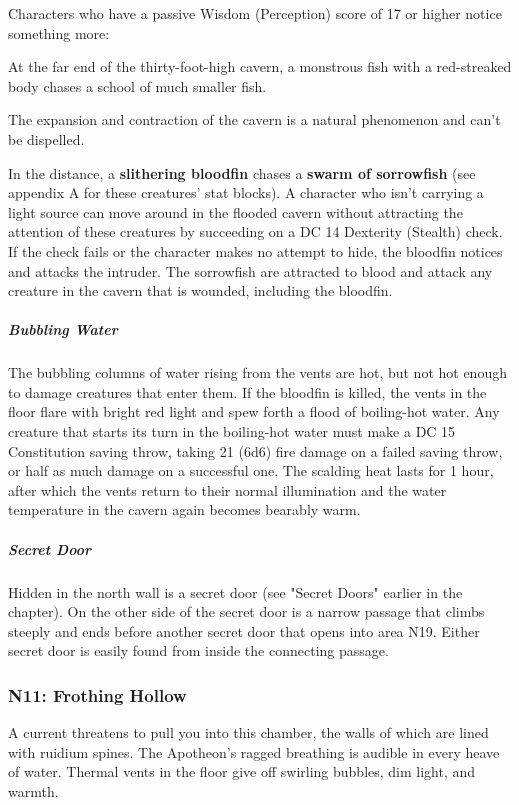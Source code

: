 \documentclass[10pt,a4paper,twoside,fancy,bg=print,twocolumn,openany,nodeprecatedcode]{dndbook}
\begin{document}
Characters who have a passive Wisdom (Perception) score of 17 or higher notice something more:

\begin{DndReadAloud}{}
At the far end of the thirty-foot-high cavern, a monstrous fish with a red-streaked body chases a school of much smaller fish.

\end{DndReadAloud}

The expansion and contraction of the cavern is a natural phenomenon and can't be dispelled.

In the distance, a \textbf{slithering bloodfin} chases a \textbf{swarm of sorrowfish} (see appendix A for these creatures' stat blocks). A character who isn't carrying a light source can move around in the flooded cavern without attracting the attention of these creatures by succeeding on a DC 14 Dexterity (Stealth) check. If the check fails or the character makes no attempt to hide, the bloodfin notices and attacks the intruder. The sorrowfish are attracted to blood and attack any creature in the cavern that is wounded, including the bloodfin.

\subparagraph{Bubbling Water}
The bubbling columns of water rising from the vents are hot, but not hot enough to damage creatures that enter them. If the bloodfin is killed, the vents in the floor flare with bright red light and spew forth a flood of boiling-hot water. Any creature that starts its turn in the boiling-hot water must make a DC 15 Constitution saving throw, taking 21 (6d6) fire damage on a failed saving throw, or half as much damage on a successful one. The scalding heat lasts for 1 hour, after which the vents return to their normal illumination and the water temperature in the cavern again becomes bearably warm.

\subparagraph{Secret Door}
Hidden in the north wall is a secret door (see "Secret Doors" earlier in the chapter). On the other side of the secret door is a narrow passage that climbs steeply and ends before another secret door that opens into area N19. Either secret door is easily found from inside the connecting passage.

\subsubsection{N11: Frothing Hollow}
\begin{DndReadAloud}{}
A current threatens to pull you into this chamber, the walls of which are lined with ruidium spines. The Apotheon's ragged breathing is audible in every heave of water. Thermal vents in the floor give off swirling bubbles, dim light, and warmth.

\end{DndReadAloud}
\end{document}
